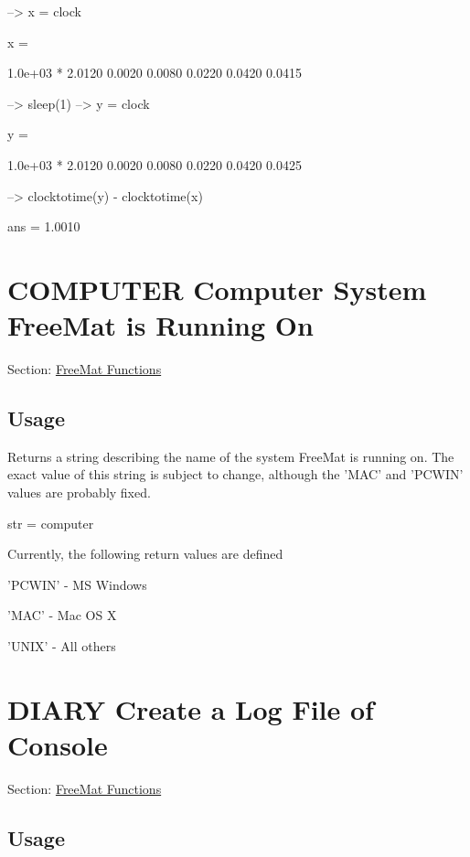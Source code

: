 \begin{DoxyVerbInclude}
--> x = clock

x = 

   1.0e+03 * 
    2.0120    0.0020    0.0080    0.0220    0.0420    0.0415 

--> sleep(1)
--> y = clock

y = 

   1.0e+03 * 
    2.0120    0.0020    0.0080    0.0220    0.0420    0.0425 

--> clocktotime(y) - clocktotime(x)

ans = 
    1.0010 
\end{DoxyVerbInclude}
 \hypertarget{freemat_computer}{}\section{C\-O\-M\-P\-U\-T\-E\-R Computer System Free\-Mat is Running On}\label{freemat_computer}
Section\-: \hyperlink{sec_freemat}{Free\-Mat Functions} \hypertarget{vtkwidgets_vtkxyplotwidget_Usage}{}\subsection{Usage}\label{vtkwidgets_vtkxyplotwidget_Usage}
Returns a string describing the name of the system Free\-Mat is running on. The exact value of this string is subject to change, although the {\ttfamily 'M\-A\-C'} and {\ttfamily 'P\-C\-W\-I\-N'} values are probably fixed. \begin{DoxyVerb}  str = computer
\end{DoxyVerb}
 Currently, the following return values are defined 
\begin{DoxyItemize}
\item {\ttfamily 'P\-C\-W\-I\-N'} -\/ M\-S Windows  
\item {\ttfamily 'M\-A\-C'} -\/ Mac O\-S X  
\item {\ttfamily 'U\-N\-I\-X'} -\/ All others  
\end{DoxyItemize}\hypertarget{freemat_diary}{}\section{D\-I\-A\-R\-Y Create a Log File of Console}\label{freemat_diary}
Section\-: \hyperlink{sec_freemat}{Free\-Mat Functions} \hypertarget{vtkwidgets_vtkxyplotwidget_Usage}{}\subsection{Usage}\label{vtkwidgets_vtkxyplotwidget_Usage}

